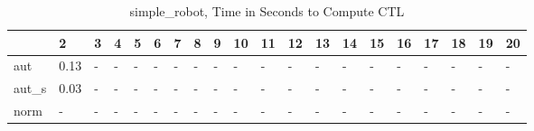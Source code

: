 \begin{table}
\caption{simple_robot, Time in Seconds to Compute CTL}
\label{simple_robot_CTL_time}
\begin{tabular}{llllllllllllllllllll}
\toprule
 & 2 & 3 & 4 & 5 & 6 & 7 & 8 & 9 & 10 & 11 & 12 & 13 & 14 & 15 & 16 & 17 & 18 & 19 & 20 \\
\midrule
aut & 0.13 & - & - & - & - & - & - & - & - & - & - & - & - & - & - & - & - & - & - \\
aut_s & 0.03 & - & - & - & - & - & - & - & - & - & - & - & - & - & - & - & - & - & - \\
norm & - & - & - & - & - & - & - & - & - & - & - & - & - & - & - & - & - & - & - \\
\bottomrule
\end{tabular}
\end{table}
